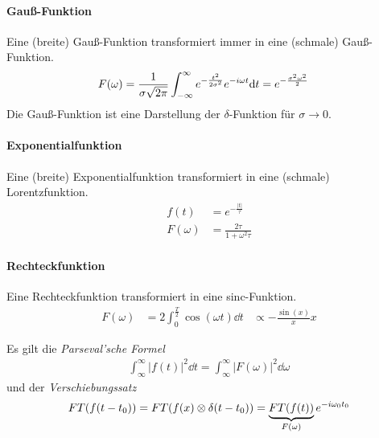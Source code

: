 \paragraph{Gauß-Funktion} Eine (breite) Gauß-Funktion transformiert
immer in eine (schmale) Gauß-Funktion.
\begin{align*}
  F(\omega) &= \frac{1}{\sigma\sqrt{2\pi}}\int_{-\infty}^{\infty}
              e^{-\frac{t^2}{2\sigma^2}} e^{-i\omega t} \mathrm{d} t
              = e^{-\frac{\sigma^2\omega^2}{2}}
\end{align*}
Die Gauß-Funktion ist eine Darstellung der $\delta$-Funktion für
$\sigma\longrightarrow 0$.

\paragraph{Exponentialfunktion} Eine (breite) Exponentialfunktion
transformiert in eine (schmale) Lorentzfunktion.
\begin{align*}
  f(t) &= e^{-\frac{\vert t\vert}{\tau}}\\
  F(\omega) &= \frac{2\tau}{1+\omega^2\tau}
\end{align*}

\paragraph{Rechteckfunktion} Eine Rechteckfunktion transformiert in
eine sinc-Funktion.
\begin{align*}
  F(\omega) &= 2\int_{0}^{\frac{T}{2}}\cos(\omega t)\dd t
  &\propto -\frac{\sin(x)}{x} x
\end{align*}



Es gilt die \emph{Parseval'sche Formel}
\begin{gather*}
  \int_{\infty}^{\infty} |f(t)|^2 \dd t 
  = \int_{\infty}^{\infty} |F(\omega)|^2 \dd\omega
\end{gather*}
und der \emph{Verschiebungssatz}
\begin{align*}
  FT(f(t-t_0)) = FT(f(x)\otimes\delta(t-t_0))
  = \underbrace{FT(f(t))}_{F(\omega)}e^{-i\omega_0 t_0}
\end{align*}


